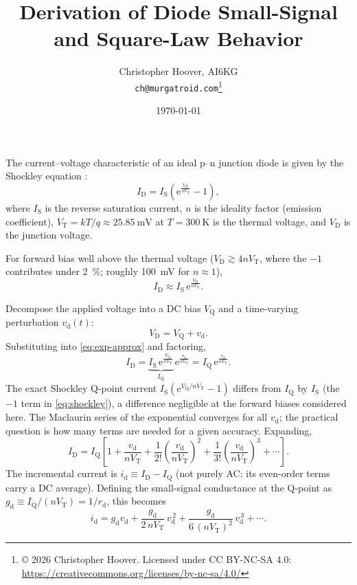 \documentclass[12pt]{article}
\title{Derivation of Diode Small-Signal and Square-Law Behavior}
\author{Christopher Hoover, AI6KG \\ \texttt{ch@murgatroid.com}\thanks{\copyright{} 2026 Christopher Hoover. Licensed under CC BY-NC-SA 4.0: \url{https://creativecommons.org/licenses/by-nc-sa/4.0/}}}
\date{\today}
\newcommand{\ID}{I_{\mathrm{D}}}
\newcommand{\VD}{V_{\mathrm{D}}}
\newcommand{\IS}{I_{\mathrm{S}}}
\newcommand{\VT}{V_{\mathrm{T}}}
\newcommand{\VQ}{V_{\mathrm{Q}}}
\newcommand{\IQ}{I_{\mathrm{Q}}}
\newcommand{\vd}{v_{\mathrm{d}}}
\newcommand{\id}{i_{\mathrm{d}}}
\newcommand{\gd}{g_{\mathrm{d}}}
\newcommand{\rd}{r_{\mathrm{d}}}
\newcommand{\eu}{\mathrm{e}}        %
\begin{document}
\maketitle

The current--voltage characteristic of an ideal p--n junction diode is given by the Shockley equation \cite{sze}:
\begin{equation}
\ID = \IS \left( \eu^{\frac{\VD}{n \VT}} - 1 \right),
\label{eq:shockley}
\end{equation}
where $\IS$ is the reverse saturation current, $n$ is the ideality factor (emission coefficient), $\VT = kT/q \approx \SI{25.85}{\milli\volt}$ at $T = \SI{300}{\kelvin}$ is the thermal voltage, and $\VD$ is the junction voltage.

For forward bias well above the thermal voltage ($\VD \gtrsim 4n\VT$, where the $-1$ contributes under \SI{2}{\percent}; roughly \SI{100}{\milli\volt} for $n \approx 1$),
\begin{equation}
\ID \approx \IS\, \eu^{\frac{\VD}{n \VT}}.
\label{eq:exp-approx}
\end{equation}

Decompose the applied voltage into a DC bias $\VQ$ and a time-varying perturbation $\vd(t)$:
\begin{equation}
\VD = \VQ + \vd.
\end{equation}
Substituting into \eqref{eq:exp-approx} and factoring,
\begin{equation}
\ID = \underbrace{\IS\, \eu^{\frac{\VQ}{n \VT}}}_{\displaystyle \IQ}\, \eu^{\frac{\vd}{n \VT}} = \IQ\, \eu^{\frac{\vd}{n \VT}}.
\end{equation}
The exact Shockley Q-point current $\IS(\eu^{\VQ/n\VT}-1)$ differs from $\IQ$ by $\IS$ (the $-1$ term in \eqref{eq:shockley}), a difference negligible at the forward biases considered here. The Maclaurin series of the exponential converges for all $\vd$; the practical question is how many terms are needed for a given accuracy. Expanding,
\begin{equation}
\ID = \IQ \left[ 1 + \frac{\vd}{n \VT} + \frac{1}{2!}\left(\frac{\vd}{n \VT}\right)^{\!2} + \frac{1}{3!}\left(\frac{\vd}{n \VT}\right)^{\!3} + \cdots \right].
\end{equation}
The incremental current is $\id \equiv \ID - \IQ$ (not purely AC: its even-order terms carry a DC average). Defining the small-signal conductance at the Q-point as $\gd \equiv \IQ/(n \VT) = 1/\rd$, this becomes
\begin{equation}
\id = \gd \vd + \frac{\gd}{2\, n \VT}\, \vd^{\,2} + \frac{\gd}{6\,(n \VT)^2}\, \vd^{\,3} + \cdots.
\label{eq:power-series}
\end{equation}
\end{document}

